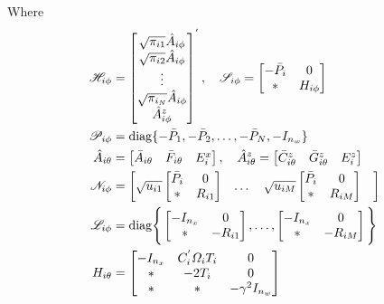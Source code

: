 \documentclass[conference]{IEEEtran}
\begin{document}
Where 
\begin{equation}\notag
\begin{aligned}
	\mathscr{H}_{i\phi}&=\begin{bmatrix}
		\sqrt{\pi_{i1}}\hat{A}_{i\phi}\\
		\sqrt{\pi_{i2}}\hat{A}_{i\phi}\\
		\vdots\\
		\sqrt{\pi_{i_N}}\hat{A}_{i\phi}\\
		\hat{A}^{z}_{i\phi}
		\end{bmatrix}^{'}, \quad
	\mathscr{S}_{i\phi}=\begin{bmatrix}
		-\bar{P}_{i}&0\\
		*&H_{i\phi}
	\end{bmatrix}\\
\mathscr{P}_{i\phi}&=\mathrm{diag}\{-\bar{P}_{1},-\bar{P}_{2},\dots,-\bar{P}_{N},-I_{n_w}  \}\\
\hat{A}_{i\theta}&=\begin{bmatrix}
\bar{A}_{i\theta}&\bar{F}_{i\theta}&E^{x}_{i}
\end{bmatrix},\quad
\hat{A}^{z}_{i\theta}=\begin{bmatrix}
\bar{C}^{z}_{i\theta}&\bar{G}^{z}_{i\theta}&E^{z}_{i}
\end{bmatrix}  \\
\mathscr{N}_{i\phi}&=\begin{bmatrix}
\sqrt{u_{i1}}\begin{bmatrix}
\bar{P}_{i}&0\\
*&R_{i1}
\end{bmatrix}&
\dots&	
\sqrt{u_{iM}}\begin{bmatrix}
\bar{P}_{i}&0\\
*&R_{iM}
\end{bmatrix}&
\end{bmatrix} \\
\mathscr{L}_{i\phi}&=\mathrm{diag}\Bigg\{\begin{bmatrix}
-I_{n_x}&0\\
*&-R_{i1}
\end{bmatrix},\dots,
\begin{bmatrix}
-I_{n_x}&0\\
*&-R_{iM}
\end{bmatrix}  \Bigg\} \\
H_{i\theta}&=\begin{bmatrix}
-I_{n_x}&C^{'}_{i}\varOmega_{i}T_{i}&0\\
*&-2T_{i}&0\\
*&*&-\gamma^{2}I_{n_w}
\end{bmatrix}
\end{aligned}
\end{equation}
\end{document}
